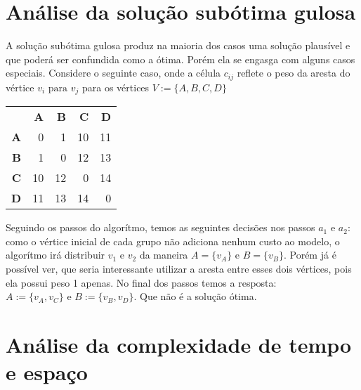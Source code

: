 \documentclass[a4paper,11pt,oneside]{article}
\begin{document}
    
    \section{An\'alise da solu\c{c}\~{a}o sub\'otima gulosa}
    A solu\c{c}\~{a}o sub\'otima gulosa produz na maioria dos casos uma solu\c{c}\~{a}o plaus\'ivel e que poder\'a ser confundida como a \'otima. Por\'em ela se engasga com alguns casos especiais. Considere o seguinte caso, onde a c\'elula \begin{math} c_{ij} \end{math} reflete o peso da aresta do v\'ertice \begin{math} v_i \text{ para } v_j \end{math} para os v\'ertices \begin{math} V := \{ A, B, C, D \}\end{math}

    \begin{center}
      \begin{tabular}{r r r r r}
	& \textbf{A} & \textbf{B} & \textbf{C} & \textbf{D} \\
	\textbf{A} & 0 & 1 & 10 & 11 \\
	\textbf{B} & 1 & 0 & 12 & 13 \\
	\textbf{C} & 10 & 12 & 0 & 14 \\
	\textbf{D} & 11 & 13 & 14 & 0
      \end{tabular}
    \end{center}
    
    Seguindo os passos do algor\'itmo, temos as seguintes decis\~{o}es nos passos \begin{math} a_1 \text{ e } a_2 \end{math}: como o v\'ertice inicial de cada grupo n\~{a}o adiciona nenhum custo ao modelo, o algor\'itmo ir\'a distribuir \begin{math} v_1 \text{ e } v_2 \end{math} da maneira \begin{math} A = \{v_A\} \text{ e } B = \{v_B\} \end{math}. Por\'em j\'a \'e poss\'ivel ver, que seria interessante utilizar a aresta entre esses dois v\'ertices, pois ela possui peso 1 apenas. No final dos passos temos a resposta: \begin{math} A := \{ v_A, v_C \} \text{ e } B := \{ v_B, v_D \}\end{math}. Que n\~{a}o \'e a solu\c{c}\~{a}o \'otima.
    
    \section{An\'alise da complexidade de tempo e espa\c{c}o} 
\end{document}
